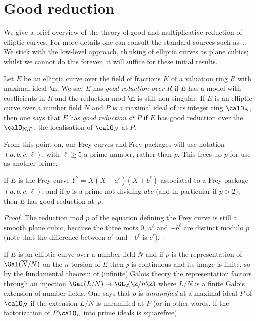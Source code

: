 \section{Good reduction}

We give a brief overview of the theory of good and multiplicative reduction of elliptic curves.
For more details one can consult the standard sources such as~\cite{silverman1}. We stick with the low-level approach, thinking of elliptic curves as plane cubics; whilst we cannot do this forever, it will suffice for these initial results.

\begin{definition}\label{EllipticCurve.GoodReduction} Let $E$ be an elliptic curve over the field of fractions $K$ of a valuation ring $R$ with maximal ideal $\m$. We say $E$ has \emph{good reduction over $R$} if $E$ has a model with 
coefficients in $R$ and the reduction mod $\m$ is still non-singular. If $E$ is an elliptic curve 
over a number field $N$ and $P$ is a maximal ideal of its integer ring $\calO_N$, then one says that $E$ has \emph{good reduction at $P$} if $E$ has good reduction over the $\calO_{N,P}$, the localisation of $\calO_N$ at $P$.
\end{definition}

\begin{remark} From this point on, our Frey curves and Frey packages will use notation $(a,b,c,\ell)$, with $\ell\geq 5$ a prime number, rather than $p$. This frees up $p$ for use as another prime.
\end{remark}

\begin{lemma}\label{Frey_curve_good_reduction} If $E$ is the Frey curve $Y^2=X(X-a^\ell)(X+b^\ell)$ associated to a
  Frey package $(a,b,c,\ell)$, and if $p$ is a prime
  not dividing $abc$ (and in particular if $p>2$), then $E$ has good reduction at~$p$.
\end{lemma}
\begin{proof} The reduction mod $p$ of the equation defining the Frey curve is still a smooth
  plane cubic, because the three roots $0$, $a^\ell$ and $-b^\ell$ are distinct modulo $p$
  (note that the difference between $a^\ell$ and $-b^\ell$ is $c^\ell$). 
\end{proof}

If $E$ is an elliptic curve over a number field $N$ and if $\rho$ is the representation
of $\Gal(\overline{N}/N)$ on the $n$-torsion of $E$ then $\rho$ is continuous and its image is finite,
so by the fundamental theorem of (infinite) Galois theory the representation factors through an
injection $\Gal(L/N)\to\GL_2(\Z/n\Z)$ where $L/N$ is a finite Galois extension of
number fields. One says that $\rho$ is \emph{unramified} at a maximal ideal $P$ of $\calO_N$
if the extension $L/N$ is unramified at $P$ (or in other words, if the factorization
of $P\calO_L$ into prime ideals is squarefree).

